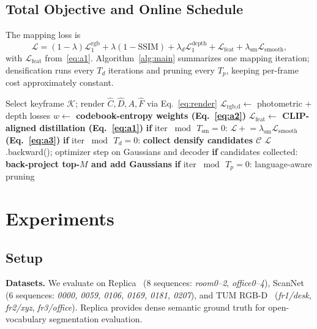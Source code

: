 \documentclass[10pt, journal]{IEEEtran}
\begin{document}
\subsection{Total Objective and Online Schedule}
The mapping loss is
\begin{equation}
\mathcal{L} = (1\!-\!\lambda)\mathcal{L}_1^{\text{rgb}} + \lambda(1\!-\!\text{SSIM}) + \lambda_d \mathcal{L}_1^{\text{depth}} + \mathcal{L}_{\text{feat}} + \lambda_{\text{sm}}\mathcal{L}_{\text{smooth}},
\label{eq:total}
\end{equation}
with $\mathcal{L}_{\text{feat}}$ from~\eqref{eq:a1}. Algorithm~\ref{alg:main}
summarizes one mapping iteration; densification runs every $T_d$ iterations and
pruning every $T_p$, keeping per-frame cost approximately constant.

\begin{algorithm}[t]
\caption{One mapping iteration (additions in \textbf{bold}).}
\label{alg:main}
\begin{algorithmic}[1]
\State Select keyframe $\mathcal{K}$; render $\hat{C},\hat{D},A,\hat{F}$ via Eq.~\eqref{eq:render}
\State $\mathcal{L}_{\text{rgb,d}} \gets$ photometric + depth losses
\State \textbf{$w \gets$ codebook-entropy weights (Eq.~\eqref{eq:a2})} 
\State \textbf{$\mathcal{L}_{\text{feat}} \gets$ CLIP-aligned distillation (Eq.~\eqref{eq:a1})} 
\State \textbf{if} iter $\bmod\, T_{\text{sm}}=0$: \textbf{$\mathcal{L}\!\mathrel{+}=\!\lambda_{\text{sm}}\mathcal{L}_{\text{smooth}}$ (Eq.~\eqref{eq:a3})} 
\State \textbf{if} iter $\bmod\, T_d=0$: \textbf{collect densify candidates $\mathcal{C}$} 
\State $\mathcal{L}$.backward(); optimizer step on Gaussians and decoder
\State \textbf{if} candidates collected: \textbf{back-project top-$M$ and add Gaussians} 
\State \textbf{if} iter $\bmod\, T_p=0$: language-aware pruning
\end{algorithmic}
\end{algorithm}

\section{Experiments}\label{sec:exp}

\subsection{Setup}
\textbf{Datasets.} We evaluate on Replica~\cite{straub2019replica} (8 sequences:
\textit{room0--2}, \textit{office0--4}), ScanNet~\cite{dai2017scannet} (6
sequences: \textit{0000, 0059, 0106, 0169, 0181, 0207}), and TUM
RGB-D~\cite{sturm2012tum} (\textit{fr1/desk}, \textit{fr2/xyz},
\textit{fr3/office}). Replica provides dense semantic ground truth for
open-vocabulary segmentation evaluation.
\end{document}
